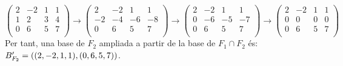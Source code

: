 \documentclass[11pt,a4paper]{article}
\begin{document}
\begin{enumerate}
\begin{enumerate}
        \begin{equation*}
            \begin{pmatrix}
              2 & -2 & 1 & 1 \\
              1 & 2 & 3 & 4 \\
              0 & 6 & 5 & 7 \\
           \end{pmatrix}\rightarrow\begin{pmatrix}
              2 & -2 & 1 & 1 \\
              -2 & -4 & -6 & -8 \\
              0 & 6 & 5 & 7 \\
           \end{pmatrix}\rightarrow\begin{pmatrix}
              2 & -2 & 1 & 1 \\
              0 & -6 & -5 & -7 \\
              0 & 6 & 5 & 7 \\
           \end{pmatrix}\rightarrow\begin{pmatrix}
              2 & -2 & 1 & 1 \\
              0 & 0 & 0 & 0 \\
              0 & 6 & 5 & 7 \\
           \end{pmatrix}
        \end{equation*}
        Per tant, una base de $F_2$ ampliada a partir de la base de $F_1\cap F_2$ és: $B'_{F_2}=((2,-2,1,1),\\(0,6,5,7))$.
        

\end{enumerate}
\end{enumerate}
\end{document}
